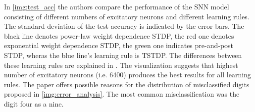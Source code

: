 In \autoref{img:test_acc} the authors compare the performance of the \ac{SNN} model consisting of different numbers of excitatory neurons and different learning rules.
The standard deviation of the test accuracy is indicated by the error bars.
The black line denotes power-law weight dependence \ac{STDP}, the red one denotes exponential weight dependence \ac{STDP}, 
the green one indicates pre-and-post \ac{STDP}, wheras the blue line's learning rule is \ac{TSTDP}.
The differences between these learning rules are explained in \cite{SNN}.
The visualization suggests that highest number of excitatory neurons (i.e. 6400) produces the best results for all learning rules.
The paper offers possible reasons for the distribution of misclassified digits proposed in \autoref{img:error_analysis}.
The most common misclassification was the digit four as a nine.

